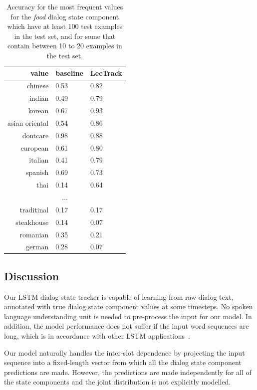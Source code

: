 \documentclass[10pt,twocolumn]{article}
\begin{document}
\begin{table}
    \centering
    \begin{tabular}{|r|ll|}
    \hline
               value & baseline & LecTrack \\
    \hline
             chinese   & 0.53   & 0.82   \\
              indian   & 0.49   & 0.79   \\
              korean   & 0.67   & 0.93   \\
      asian oriental   & 0.54   & 0.86   \\
            dontcare   & 0.98   & 0.88   \\
            european   & 0.61   & 0.80   \\
             italian   & 0.41   & 0.79   \\
             spanish   & 0.69   & 0.73   \\
                thai   & 0.14   & 0.64   \\
    \multicolumn{3}{|c|}{...} \\
                traditinal  & 0.17  & 0.17 \\
               steakhouse   & 0.14  & 0.07 \\
                romanian    & 0.35  & 0.21 \\
                german      & 0.28  & 0.07 \\
    \hline
    \end{tabular}

    \medskip
    \caption{Accuracy for the most frequent values for the \emph{food} dialog state component which have at least 100 test examples in the test set, and for some that contain between 10 to 20 examples in the test set.}
    \label{table:resultsFreq}
\end{table}

\subsection{Discussion}
\label{sec:discussion}
Our LSTM dialog state tracker is capable of learning from raw dialog text, annotated with true dialog state component values at some timesteps. No spoken language understanding unit is needed to pre-process the input for our model. In addition, the model performance does not suffer if the input word sequences are long, which is in accordance with other LSTM applications~\cite{sutskever2014sequence}.

Our model naturally handles the inter-slot dependence by projecting the input sequence into a fixed-length vector from which all the dialog state component predictions are made. However, the predictions are made independently for all of the state components and the joint distribution is not explicitly modelled.
\end{document}
